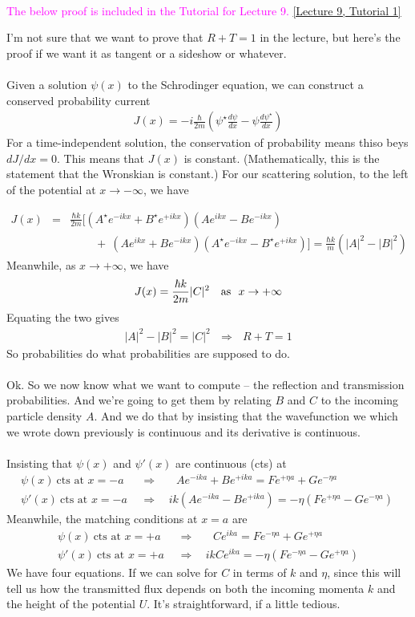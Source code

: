 \documentclass[12pt]{article}
\def\be{\begin{eqnarray}}
\def\ee{\end{eqnarray}}
\newcommand{\nn}{\nonumber}
\newcommand\para{\paragraph{}}
\newcommand{\ra}{\rightarrow}
\newcommand{\co}{\color{olive}}
\newcommand{\cblue}{\color{blue}}
\newcommand{\alyssa}{\textcolor{magenta}}
\begin{document}
\para

\alyssa{The below proof is included in the Tutorial for Lecture 9.} \href{https://drive.google.com/file/d/1RMR5gRvQ70qLkgVSp1QA3s2LBOTQ9TER/view?usp=drive_link}{[Lecture 9, Tutorial 1]}
{\cblue
I'm not sure that we want to prove that $R+T=1$ in the lecture, but here's the proof if we want it as tangent or a sideshow or whatever.

\para
Given a solution $\psi(x)$ to the Schrodinger equation, we can construct a conserved probability current
%
\be
J(x) = -i \frac{\hbar}{2m}\left(\psi^\star\frac{d\psi}{dx} - \psi \frac{d\psi^\star}{dx}\right)\nn\ee
%
For a time-independent solution, the conservation  of probability means thiso beys $dJ/dx=0$. This means that $J(x)$ is constant. (Mathematically, this is the statement that the Wronskian is constant.) For our scattering solution, to the left of the potential at $x\ra -\infty$, we have

\be J(x) &=& \frac{\hbar k}{2m}\Big[\left(A^\star e^{-ikx} + B^\star e^{+ikx}\right)\left(Ae^{ikx} - B e^{-ikx}\right) \\ &&\ \ \ \ \ \ \ \ \ \  +\  \left(A e^{ikx} + B e^{-ikx}\right)\left(A^\star e^{-ikx} - B^\star e^{+ikx}\right) \Big] =  \frac{\hbar k}{m}\left(|A|^2-|B|^2\right)\nn\ee
%
Meanwhile, as $x\rightarrow +\infty$, we have
%
\be J(x) = \frac{\hbar k}{2m}|C|^2\ \ \  {\rm as} \ \ x\rightarrow +\infty \nn\ee
%
Equating the two gives
%
\be |A|^2-|B|^2 = |C|^2 \ \ \ \Longrightarrow \ \ \ R+T = 1\nn\ee
%
So probabilities do what probabilities are supposed to do.}

\para
Ok. So we now know what we want to compute -- the reflection and transmission probabilities. And we're going to get them by relating $B$ and $C$ to the incoming particle density $A$. And we do that by insisting that the wavefunction we which we wrote down previously is continuous and its derivative is continuous. 


\para
{\co Insisting that $\psi(x)$ and $\psi'(x)$ are continuous (cts) at 
%
\be \psi(x)\ \mbox{cts at $x=-a$}\ \ \  &\Longrightarrow& \ \ \ \ \ Ae^{-ika} + Be^{+ika}=Fe^{+\eta a} + Ge^{-\eta a} \nn\\ 
\psi'(x)\ \mbox{cts at $x=-a$}\ \ \  &\Longrightarrow& \ \ ik(Ae^{-ika}-Be^{+ika}) = -\eta(Fe^{+\eta a} - Ge^{-\eta a})\ \nn \ee
%
Meanwhile, the matching conditions at $x=a$ are
%
\be \psi(x)\ \mbox{cts at $x=+a$} \ \ \ &\Longrightarrow& \ \ \ \ \ Ce^{ika} =Fe^{-\eta a} + Ge^{+\eta a} \nn\\ 
\psi'(x)\ \mbox{cts at $x=+a$} \ \ \ &\Longrightarrow& \ \ ikCe^{ika} = -\eta(Fe^{-\eta a} - Ge^{+\eta a})\nn\ee
%
}
We have four equations. If we can solve for  $C$ in terms of $k$ and $\eta$, since this will tell us how the transmitted flux depends on both the incoming momenta $k$ and the height of the potential $U$.  It's straightforward, if a little tedious. 
\end{document}
